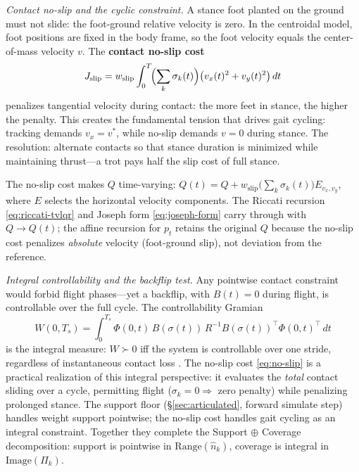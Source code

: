 \medskip\noindent\emph{Contact no-slip and the cyclic constraint.}
A stance foot planted on the ground must not slide: the foot-ground
relative velocity is zero.
In the centroidal model, foot positions are fixed in the body frame,
so the foot velocity equals the center-of-mass velocity $v$.
The \textbf{contact no-slip cost}
\begin{equation}\label{eq:no-slip}
J_{\mathrm{slip}}
= w_{\mathrm{slip}} \int_0^T \!\Bigl(\sum_k \sigma_k(t)\Bigr)
  \bigl(v_x(t)^2 + v_y(t)^2\bigr)\,dt
\end{equation}
penalizes tangential velocity during contact: the more feet in stance,
the higher the penalty.
This creates the fundamental tension that drives gait cycling:
tracking demands $v_x = v^*$, while no-slip demands $v = 0$ during
stance.
The resolution: alternate contacts so that stance duration is minimized
while maintaining thrust---a trot pays half the slip cost of full stance.

The no-slip cost makes $Q$ time-varying:
$Q(t) = Q + w_{\mathrm{slip}} \bigl(\sum_k \sigma_k(t)\bigr) E_{v_x, v_y}$,
where $E$ selects the horizontal velocity components.
The Riccati recursion \eqref{eq:riccati-tvlqr} and Joseph form
\eqref{eq:joseph-form} carry through with $Q \to Q(t)$;
the affine recursion for $p_t$ retains the original $Q$ because the
no-slip cost penalizes \emph{absolute} velocity (foot-ground slip),
not deviation from the reference.

\smallskip\noindent\emph{Integral controllability and the backflip test.}
Any pointwise contact constraint would forbid flight phases---yet a
backflip, with $B(t) = 0$ during flight, is controllable over the
full cycle.
The controllability Gramian
\[
W(0, T_s) = \int_0^{T_s}
  \Phi(0,t)\, B(\sigma(t))\, R^{-1} B(\sigma(t))^\top \Phi(0,t)^\top\, dt
\]
is the integral measure: $W \succ 0$ iff the system is controllable
over one stride, regardless of instantaneous contact loss
\cite{Raibert}.
The no-slip cost \eqref{eq:no-slip} is a practical realization of this
integral perspective: it evaluates the \emph{total} contact sliding over
a cycle, permitting flight ($\sigma_k = 0 \Rightarrow$ zero penalty)
while penalizing prolonged stance.
The support floor (\S\ref{sec:articulated}, forward simulate step)
handles weight support pointwise; the no-slip cost handles gait cycling
as an integral constraint.
Together they complete the Support $\oplus$ Coverage decomposition:
support is pointwise in $\mathrm{Range}(\hat{n}_k)$, coverage is
integral in $\mathrm{Image}(\Pi_k)$.

